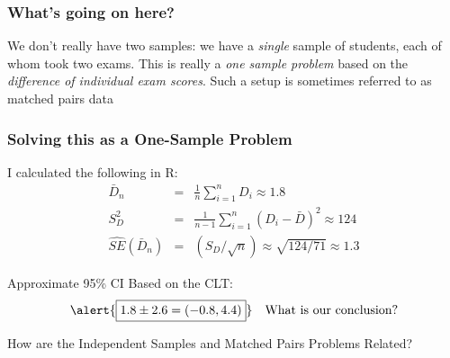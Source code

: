 \begin{frame}
\frametitle{What's going on here?}

We don't really have two samples: we have a \emph{single} sample of students, each of whom took two exams. This is really a \emph{one sample problem} based on the \emph{difference of individual exam scores}. Such a setup is sometimes referred to as \alert{matched pairs data}

\vspace{2em}


\end{frame}
\begin{frame}
\frametitle{Solving this as a One-Sample Problem}
\small
{}

\vspace{2em}
I calculated the following in R:
	\begin{eqnarray*}
	\bar{D}_n &=& \frac{1}{n}\sum_{i=1}^n D_i \approx 1 .8\\
	S^2_D &=& \frac{1}{n-1}\sum_{i=1}^n (D_i - \bar{D})^2 \approx 	124\\ 
	\widehat{SE}(\bar{D}_n) &=&(S_D /\sqrt{n}) \approx \sqrt{124/71} \approx 1.3 
	\end{eqnarray*}
	
\vspace{1em}
\alert{Approximate 95\% CI Based on the CLT:}
$$\alert{\boxed{1.8 \pm 2.6 = (-0.8, 4.4)}} \quad \mbox{What is our conclusion?}$$

\end{frame}
\begin{frame}
	\begin{center}
	\Huge How are the Independent Samples and Matched Pairs Problems Related?
	\end{center}
\end{frame}

